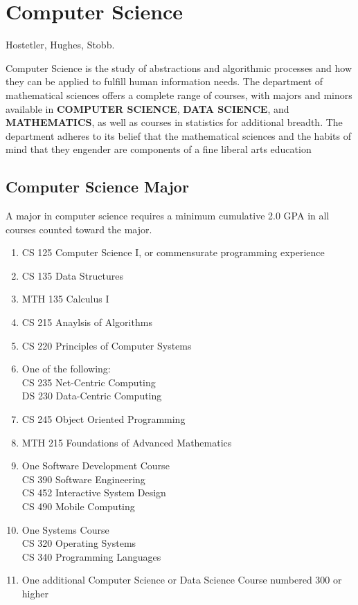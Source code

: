 \documentclass[
  letterpaper,
]{scrbook}
\providecommand{\tightlist}{%
  \setlength{\itemsep}{0pt}\setlength{\parskip}{0pt}}
\begin{document}
\section{Computer Science}\label{computer-science}

Hostetler, Hughes, Stobb.

Computer Science is the study of abstractions and algorithmic processes
and how they can be applied to fulfill human information needs. The
department of mathematical sciences offers a complete range of courses,
with majors and minors available in \textbf{COMPUTER SCIENCE},
\textbf{DATA SCIENCE}, and \textbf{MATHEMATICS}, as well as courses in
statistics for additional breadth. The department adheres to its belief
that the mathematical sciences and the habits of mind that they engender
are components of a fine liberal arts education

\subsection{Computer Science Major}\label{computer-science-major}

A major in computer science requires a minimum cumulative 2.0 GPA in all
courses counted toward the major.

\begin{enumerate}
\def\labelenumi{\arabic{enumi}.}
\tightlist
\item
  CS 125 Computer Science I, or commensurate programming experience
\item
  CS 135 Data Structures
\item
  MTH 135 Calculus I
\item
  CS 215 Anaylsis of Algorithms
\item
  CS 220 Principles of Computer Systems
\item
  One of the following:\\
  CS 235 Net-Centric Computing\\
  DS 230 Data-Centric Computing\\
\item
  CS 245 Object Oriented Programming\\
\item
  MTH 215 Foundations of Advanced Mathematics\\
\item
  One Software Development Course\\
  CS 390 Software Engineering\\
  CS 452 Interactive System Design\\
  CS 490 Mobile Computing\\
\item
  One Systems Course\\
  CS 320 Operating Systems\\
  CS 340 Programming Languages\\
\item
  One additional Computer Science or Data Science Course numbered 300 or
  higher
\end{enumerate}
\end{document}
